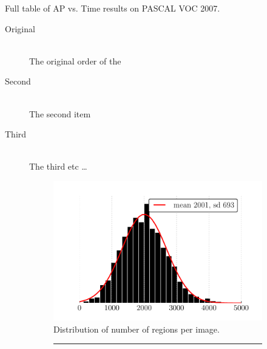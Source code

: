 \begin{table}[ht]
\centering
\caption{
Full table of AP vs. Time results on PASCAL VOC 2007.
}\label{tab:results}
\small{

}
\end{table}

\begin{description}
  \item[Original] \hfill \\
  The original order of the
  \item[Second] \hfill \\
  The second item
  \item[Third] \hfill \\
  The third etc \ldots
\end{description}

\begin{figure}
\centering
\begin{subfigure}[b]{0.52\linewidth}
    \includegraphics[width=\linewidth]{figures/roi_hist.pdf}
    \caption{Distribution of number of regions per image.}\label{fig:roi_hist}
\end{subfigure}\hfill
\begin{subfigure}[b]{0.46\linewidth}
    \rule{5cm}{4cm}
    \caption{}\label{fig:PLACEHOLDER}
\end{subfigure}
\caption{}
\end{figure}
